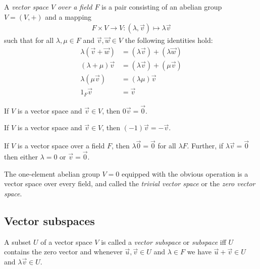 \documentclass{article}
\begin{document}
\begin{definition}
	A \emph{vector space $V$ over a field $F$} is a pair consisting of an abelian
	group $V=(V,+)$ and a mapping
	\begin{align*}
		F\times V\to V:(\lambda,\vec v) \mapsto \lambda \vec v
	\end{align*}
	such that for all $\lambda,\mu\in F$ and $\vec v,\vec w\in V$ the following
	identities hold:
	\begin{align*}
		\lambda(\vec v + \vec w) & = (\lambda\vec v) + (\lambda \vec w) \\
		(\lambda +\mu)\vec v     & = (\lambda\vec v) + (\mu \vec v)     \\
		\lambda(\mu\vec v)       & = (\lambda\mu)\vec v                 \\
		1_F \vec v               & = \vec v
	\end{align*}
\end{definition}

\begin{lemma}[Lemma 1.2.2]
	If $V$ is a vector space and $\vec v\in V$, then $0\vec v =\vec 0$.
\end{lemma}

\begin{lemma}[Lemma 1.2.3]
	If $V$ is a vector space and $\vec v\in V$, then $(-1)\vec v = -\vec v$.
\end{lemma}

\begin{lemma}[Lemma 1.2.4]
	If $V$ is a vector space over a field $F$, then $\lambda\vec 0=\vec 0$
	for all $\lambda F$. Further, if $\lambda\vec v=\vec 0$ then either
	$\lambda =0$ or $\vec v =\vec 0$.
\end{lemma}

\begin{definition}
	The one-element abelian group $V=0$ equipped with the
	obvious operation is a vector space over every field, and called the
	\emph{trivial vector space} or the \emph{zero vector space}.
\end{definition}

\subsection{Vector subspaces}

\begin{definition}
	A subset $U$ of a vector space $V$ is called a \emph{vector subspace} or
	\emph{subspace} iff $U$ contains the zero vector and whenever $\vec u,\vec v\in U$
	and $\lambda\in F$ we have $\vec u + \vec v\in U$ and $\lambda\vec v\in U$.
\end{definition}
\end{document}
